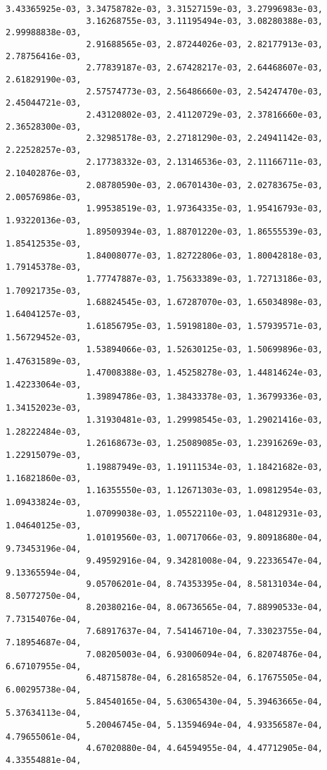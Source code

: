 \documentclass[11pt]{article}
\begin{document}
\begin{Verbatim}[commandchars=\\\{\}]
                3.43365925e-03, 3.34758782e-03, 3.31527159e-03, 3.27996983e-03,
                3.16268755e-03, 3.11195494e-03, 3.08280388e-03, 2.99988838e-03,
                2.91688565e-03, 2.87244026e-03, 2.82177913e-03, 2.78756416e-03,
                2.77839187e-03, 2.67428217e-03, 2.64468607e-03, 2.61829190e-03,
                2.57574773e-03, 2.56486660e-03, 2.54247470e-03, 2.45044721e-03,
                2.43120802e-03, 2.41120729e-03, 2.37816660e-03, 2.36528300e-03,
                2.32985178e-03, 2.27181290e-03, 2.24941142e-03, 2.22528257e-03,
                2.17738332e-03, 2.13146536e-03, 2.11166711e-03, 2.10402876e-03,
                2.08780590e-03, 2.06701430e-03, 2.02783675e-03, 2.00576986e-03,
                1.99538519e-03, 1.97364335e-03, 1.95416793e-03, 1.93220136e-03,
                1.89509394e-03, 1.88701220e-03, 1.86555539e-03, 1.85412535e-03,
                1.84008077e-03, 1.82722806e-03, 1.80042818e-03, 1.79145378e-03,
                1.77747887e-03, 1.75633389e-03, 1.72713186e-03, 1.70921735e-03,
                1.68824545e-03, 1.67287070e-03, 1.65034898e-03, 1.64041257e-03,
                1.61856795e-03, 1.59198180e-03, 1.57939571e-03, 1.56729452e-03,
                1.53894066e-03, 1.52630125e-03, 1.50699896e-03, 1.47631589e-03,
                1.47008388e-03, 1.45258278e-03, 1.44814624e-03, 1.42233064e-03,
                1.39894786e-03, 1.38433378e-03, 1.36799336e-03, 1.34152023e-03,
                1.31930481e-03, 1.29998545e-03, 1.29021416e-03, 1.28222484e-03,
                1.26168673e-03, 1.25089085e-03, 1.23916269e-03, 1.22915079e-03,
                1.19887949e-03, 1.19111534e-03, 1.18421682e-03, 1.16821860e-03,
                1.16355550e-03, 1.12671303e-03, 1.09812954e-03, 1.09433824e-03,
                1.07099038e-03, 1.05522110e-03, 1.04812931e-03, 1.04640125e-03,
                1.01019560e-03, 1.00717066e-03, 9.80918680e-04, 9.73453196e-04,
                9.49592916e-04, 9.34281008e-04, 9.22336547e-04, 9.13365594e-04,
                9.05706201e-04, 8.74353395e-04, 8.58131034e-04, 8.50772750e-04,
                8.20380216e-04, 8.06736565e-04, 7.88990533e-04, 7.73154076e-04,
                7.68917637e-04, 7.54146710e-04, 7.33023755e-04, 7.18954687e-04,
                7.08205003e-04, 6.93006094e-04, 6.82074876e-04, 6.67107955e-04,
                6.48715878e-04, 6.28165852e-04, 6.17675505e-04, 6.00295738e-04,
                5.84540165e-04, 5.63065430e-04, 5.39463665e-04, 5.37634113e-04,
                5.20046745e-04, 5.13594694e-04, 4.93356587e-04, 4.79655061e-04,
                4.67020880e-04, 4.64594955e-04, 4.47712905e-04, 4.33554881e-04,

\end{Verbatim}
\end{document}
